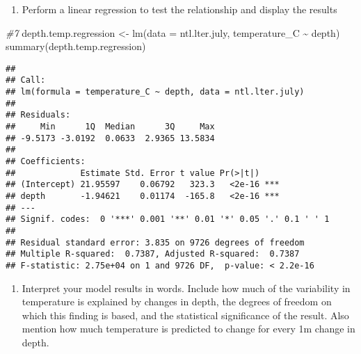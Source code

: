 \documentclass[
]{article}
\newenvironment{Shaded}{\begin{snugshade}}{\end{snugshade}}
\newcommand{\AttributeTok}[1]{\textcolor[rgb]{0.77,0.63,0.00}{#1}}
\newcommand{\CommentTok}[1]{\textcolor[rgb]{0.56,0.35,0.01}{\textit{#1}}}
\newcommand{\FunctionTok}[1]{\textcolor[rgb]{0.00,0.00,0.00}{#1}}
\newcommand{\NormalTok}[1]{#1}
\newcommand{\OtherTok}[1]{\textcolor[rgb]{0.56,0.35,0.01}{#1}}
\newcommand{\SpecialCharTok}[1]{\textcolor[rgb]{0.00,0.00,0.00}{#1}}
\providecommand{\tightlist}{%
  \setlength{\itemsep}{0pt}\setlength{\parskip}{0pt}}
\begin{document}
\begin{enumerate}
\def\labelenumi{\arabic{enumi}.}
\setcounter{enumi}{6}
\tightlist
\item
  Perform a linear regression to test the relationship and display the
  results
\end{enumerate}

\begin{Shaded}
\begin{Highlighting}[]
\CommentTok{\#7}
\NormalTok{depth.temp.regression }\OtherTok{\textless{}{-}} \FunctionTok{lm}\NormalTok{(}\AttributeTok{data =}\NormalTok{ ntl.lter.july, }
\NormalTok{                            temperature\_C }\SpecialCharTok{\textasciitilde{}}\NormalTok{ depth)}
\FunctionTok{summary}\NormalTok{(depth.temp.regression)}
\end{Highlighting}
\end{Shaded}

\begin{verbatim}
## 
## Call:
## lm(formula = temperature_C ~ depth, data = ntl.lter.july)
## 
## Residuals:
##     Min      1Q  Median      3Q     Max 
## -9.5173 -3.0192  0.0633  2.9365 13.5834 
## 
## Coefficients:
##             Estimate Std. Error t value Pr(>|t|)    
## (Intercept) 21.95597    0.06792   323.3   <2e-16 ***
## depth       -1.94621    0.01174  -165.8   <2e-16 ***
## ---
## Signif. codes:  0 '***' 0.001 '**' 0.01 '*' 0.05 '.' 0.1 ' ' 1
## 
## Residual standard error: 3.835 on 9726 degrees of freedom
## Multiple R-squared:  0.7387, Adjusted R-squared:  0.7387 
## F-statistic: 2.75e+04 on 1 and 9726 DF,  p-value: < 2.2e-16
\end{verbatim}

\begin{enumerate}
\def\labelenumi{\arabic{enumi}.}
\setcounter{enumi}{7}
\tightlist
\item
  Interpret your model results in words. Include how much of the
  variability in temperature is explained by changes in depth, the
  degrees of freedom on which this finding is based, and the statistical
  significance of the result. Also mention how much temperature is
  predicted to change for every 1m change in depth.
\end{enumerate}
\end{document}
